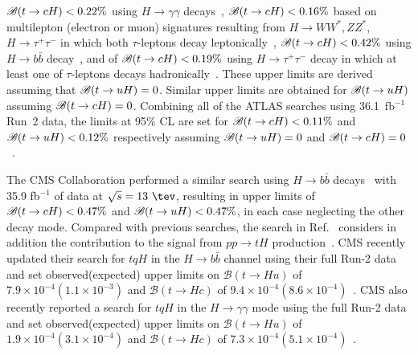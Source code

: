 $\mathscr{B}(t\to cH)<0.22\%$ using $H\to \gamma\gamma$ decays~\cite{Aaboud:2017mfd}, $\mathscr{B}(t\to cH)<0.16\%$ based on
multilepton (electron or muon) signatures resulting from 
$H \to  WW^*, ZZ^*$, $H\to \tau^+\tau^-$ in which both $\tau$-leptons decay leptonically~\cite{Aaboud:2018pob},
$\mathscr{B}(t\to cH)<0.42\%$ using $H\to b\bar{b}$ decay~\cite{fcnc36}, and of $\mathscr{B}(t\to cH)<0.19\%$ using $H\to \tau^+\tau^-$ decay in which at least
one of $\tau$-leptons decays hadronically~\cite{fcnc36}.  
These upper limits are derived assuming that $\mathscr{B}(t\to uH)=0$. Similar upper limits are obtained for $\mathscr{B}(t\to uH)$ assuming $\mathscr{B}(t\to cH)=0$.
Combining all of the ATLAS searches using 36.1~fb$^{-1}$ Run~2 data, the limits at 95\% CL are set for  $\mathscr{B}(t\to cH)<0.11\%$ and $\mathscr{B}(t\to uH)<0.12\%$ respectively assuming $\mathscr{B}(t\to uH)=0$ and $\mathscr{B}(t\to cH)=0$~\cite{fcnc36}.

The CMS Collaboration performed a similar search using  
$H\to b\bar{b}$ decays~\cite{Sirunyan:2017uae} with 35.9 fb$^{-1}$ of data at $\sqrt{s}=13~\tev$, resulting 
in upper limits of $\mathscr{B}(t\to cH)<0.47\%$ and $\mathscr{B}(t\to uH)<0.47\%$, in each case neglecting the other decay mode.
Compared with previous searches, the search in Ref.~\cite{Sirunyan:2017uae} considers in addition the contribution to the signal from 
$pp \to tH$ production~\cite{Greljo:2014dka}. CMS recently updated their search for $tqH$ in the $H\to b\bar{b}$ channel using
their full Run-2 data and  set observed(expected) upper limits on $\mathcal{B}(t\to Hu)$ of $7.9\times10^{-4}(1.1\times10^{-3})$ and $\mathcal{B}(t\to Hc)$ of $9.4\times10^{-4}(8.6\times10^{-4})$~\cite{CMS:2021gfa}.
CMS also recently reported a search for $tqH$ in the $H\rightarrow \gamma\gamma$ mode using the full Run-2 data and set observed(expected) upper limits on $\mathcal{B}(t\to Hu)$ of $1.9\times10^{-4}(3.1\times10^{-4})$ and $\mathcal{B}(t\to Hc)$ of $7.3\times10^{-4}(5.1\times10^{-4})$~\cite{CMS-PAS-TOP-20-007}.


